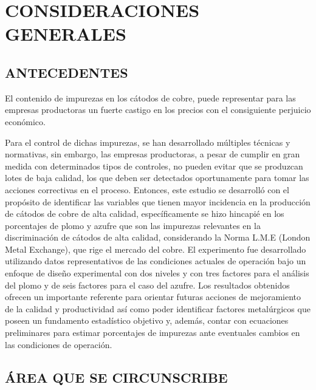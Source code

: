 \chapter{CONSIDERACIONES GENERALES}
\section{ANTECEDENTES}
El contenido de impurezas en los c\'atodos de cobre, puede representar para las empresas productoras un fuerte castigo en los precios con el consiguiente perjuicio econ\'omico.

Para el control de dichas impurezas, se han desarrollado m\'ultiples t\'ecnicas y normativas, sin embargo, las empresas productoras, a pesar de cumplir en gran medida con determinados tipos de controles, no pueden evitar que se produzcan lotes de baja calidad, los que deben ser detectados oportunamente para tomar las acciones correctivas en el proceso.
Entonces, este estudio se desarroll\'o con el prop\'osito de identificar las variables que tienen mayor incidencia en la producci\'on de c\'atodos de cobre de alta calidad, espec\'ificamente se hizo hincapi\'e en los porcentajes de plomo y azufre que son las impurezas relevantes en la discriminaci\'on de c\'atodos de alta calidad, considerando la Norma L.M.E (London Metal Exchange), que rige el mercado del cobre.
El experimento fue desarrollado utilizando datos representativos de las condiciones actuales de operaci\'on bajo un enfoque de dise\~no experimental con dos niveles y con tres factores para el an\'alisis del plomo y de seis factores para el caso del azufre.
Los resultados obtenidos ofrecen un importante referente para orientar futuras acciones de mejoramiento de la calidad y productividad as\'i como poder identificar factores metal\'urgicos que poseen un fundamento estad\'istico objetivo y, adem\'as, contar con ecuaciones preliminares para estimar porcentajes de impurezas ante eventuales cambios en las condiciones de operaci\'on.

\section{\'AREA QUE SE CIRCUNSCRIBE} 

